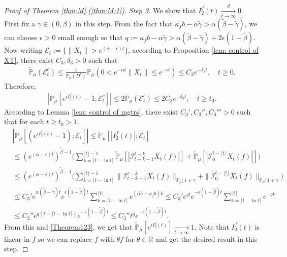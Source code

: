 \documentclass[EJP]{ejpecp} %
\begin{document}
\begin{proof}[Proof of Theorem \ref{thm:M}.(\ref{thm:M:1})]
  \emph{Step 3.}
  We show that $I^f_2(t)\xrightarrow[t\to \infty]{d} 0$.
  First fix a $\gamma \in (0,\beta)$ in this step.
  From the fact that $\kappa_f b -\alpha \tilde \gamma > \alpha (\tilde \beta - \tilde \gamma)$, we can choose $\epsilon >0$ small enough so that $q:=\kappa_fb- \alpha \tilde \gamma  > \alpha (\tilde \beta - \tilde \gamma) + 2\epsilon (1 - \tilde \beta)$.
  Now writing $\mathcal{E}_t:=\{\|X_t\|>e^{(\alpha-\epsilon) t}\}$, according to Proposition \ref{lem: control of XT}, there exist $C_3, \delta_3>0$ such that
  \begin{align}
    \mathbb{\widetilde{P}}_{\mu}(\mathcal{E}^c_t)
    \leq \frac{1}{\mathbb{P}_{\mu}(D^c)}\mathbb{P}_{\mu}(0<e^{-\alpha t}\|X_t\|\leq e^{-\epsilon t})\leq C_3e^{-\delta_3 t}
    , \quad t\geq0.
  \end{align}
  Therefore,
  \begin{align}
    \label{Theorem123}
    |\mathbb{\widetilde{P}}_{\mu}[e^{i I^f_2(t)}-1;\mathcal{E}^c_t]|
    \leq 2\mathbb{\widetilde{P}}_{\mu}(\mathcal{E}^c_t)
    \leq 2C_3e^{-\delta_3 t},
    \quad t\geq t_0.
  \end{align}
	According to Lemma \ref{lem: control of mgtrs}, there exist $C_3',C_3'',C_3'''>0$ such that for each $t\geq t_0 >1$,
  \begin{align}
    & |\mathbb{\widetilde{P}}_{\mu} [ (e^{i I^f_2(t)}-1);\mathcal{E}_t]|
      \leq  \mathbb{\widetilde{P}}_{\mu} [ |I^f_2(t)|;\mathcal{E}_t] \\
    & \leq  ( e^{(\alpha-\epsilon) t} )^{\tilde \beta - 1}\Big(\sum_{k=\lceil t-\ln t \rceil}^{\lfloor t \rfloor - 1}\mathbb{\widetilde{P}}_{\mu} [| \mathcal{I}_{t-k-1}^{t-k} X_t(f) |] + \mathbb{\widetilde{P}}_{\mu}[| \mathcal{I}_{0}^{t-\lfloor t\rfloor} X_t(f)|]\Big) \\
    & \leq ( e^{(\alpha-\epsilon) t} )^{\tilde \beta - 1}\Big(\sum_{k=\lceil t-\ln t \rceil}^{\lfloor t \rfloor - 1}\|\mathcal{I}_{t-k-1}^{t-k} X_t(f) \|_{\mathbb P_\mu; 1+\gamma} + \|\mathcal I_0^{t-\lfloor t \rfloor} X_t(f)\|_{\mathbb P_\mu;1+\gamma}\Big) \\
    & \leq C_3' e^{\alpha (\tilde \beta - \tilde \gamma)t} e ^{\epsilon (1-\tilde \beta) t}\sum_{k=\lceil t-\ln t \rceil}^{\lfloor t \rfloor}  e^{(\alpha\tilde \gamma-\kappa_f b)k}
      \leq C_3' e^{q t}e^{-\epsilon ( 1 - \tilde \beta)t}\sum_{k=\lceil t-\ln t \rceil}^{\lfloor t \rfloor}  e^{-q k}
    \\ & \leq C_3'' e^{q(t - \lceil t - \ln t\rceil)}e^{-\epsilon(1 - \tilde \beta) t}
         \leq C_3'' t^q e^{- \epsilon(1 - \tilde \beta) t}.
  \end{align}
  From this and \eqref{Theorem123}, we get that $\widetilde {\mathbb P}_\mu[e^{i I^f_2(t)}] \xrightarrow[t\to \infty]{} 1$.
  Note that $I^f_2(t)$ is linear in $f$ so we can replace $f$ with $\theta f$ for $\theta \in \mathbb R$ and get the desired result in this step.


\end{proof}
\end{document}
